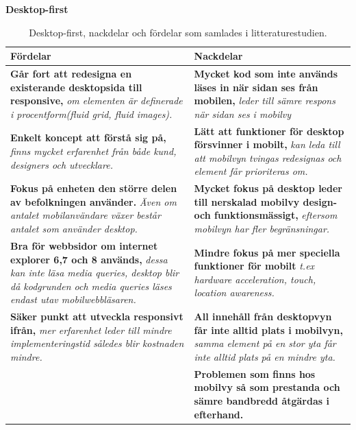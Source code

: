 \documentclass[11pt]{article}
\begin{document}
\textbf{Desktop-first}
\begin{table}[H]
\centering
\begin{tabular}{|p{7.2cm}|p{7.2cm}|}
\hline
Fördelar&Nackdelar\\ \hline
\textbf{Går fort att redesigna en existerande desktopsida till responsive, }\textit{om elementen är definerade i procentform(fluid grid, fluid images).}&\textbf{Mycket kod som inte används läses in när sidan ses från mobilen, }\textit{leder till sämre respons när sidan ses i mobilvy}\\ \hline
\textbf{Enkelt koncept att förstå sig på, }\textit{finns mycket erfarenhet från både kund, designers och utvecklare.}& \textbf{Lätt att funktioner för desktop försvinner i mobilt,} \textit{kan leda till att mobilvyn tvingas redesignas och element får prioriteras om.} \\ \hline
\textbf{Fokus på enheten den större delen av befolkningen använder. }\textit{Även om antalet mobilanvändare växer består antalet som använder desktop.}&\textbf{Mycket fokus på desktop leder till nerskalad mobilvy design- och funktionsmässigt, }\textit{eftersom mobilvyn har fler begränsningar.}\\ \hline
\textbf{Bra för webbsidor om internet explorer 6,7 och 8 används, }\textit{dessa kan inte läsa media queries, desktop blir då kodgrunden och media queries läses endast utav mobilwebbläsaren.}&  \textbf{Mindre fokus  på mer speciella funktioner för mobilt} \textit{t.ex hardware acceleration, touch, location awareness.} \\ \hline
\textbf{Säker punkt att utveckla responsivt ifrån, }\textit{mer erfarenhet leder till mindre implementeringstid således blir kostnaden mindre.}&\textbf{All innehåll från desktopvyn får inte alltid plats i mobilvyn,} \textit{samma element på en stor yta får inte alltid plats på en mindre yta.}\\ \hline
~&\textbf{Problemen som finns hos mobilvy så som prestanda och sämre bandbredd åtgärdas i efterhand.}\\ \hline


    \end{tabular}
    \caption {Desktop-first, nackdelar och fördelar som samlades i litteraturestudien.}
\end{table}
\newpage
\end{document}
